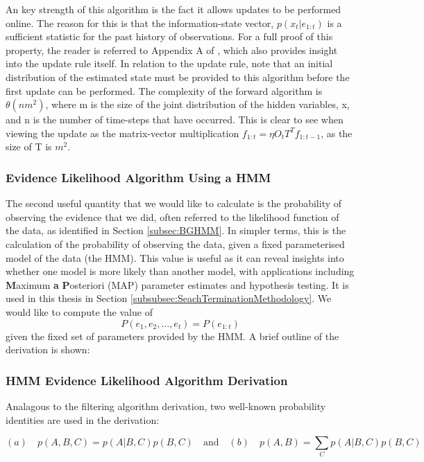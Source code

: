 An key strength of this algorithm is the fact it allows updates to be performed online. The reason for this is that the information-state vector, $p(x_t | e_{1:t})$ is a sufficient statistic for the past history of observations. For a full proof of this property, the reader is referred to Appendix A of \cite{Smallwood1973TheHorizon}, which also provides insight into the update rule itself. In relation to the update rule, note that an initial distribution of the estimated state must be provided to this algorithm before the first update can be performed. The complexity of the forward algorithm is $\theta (nm^2)$, where m is the size of the joint distribution of the hidden variables, x, and n is the number of time-steps that have occurred. This is clear to see when viewing the update as the matrix-vector multiplication $f_{1:t} = \eta O_{t} T^{T} f_{1:t-1}$, as the size of T is $m^2$.






\subsubsection{Evidence Likelihood Algorithm Using a HMM}\label{subsubsec:EvLikelihood}
The second useful quantity that we would like to calculate is the probability of observing the evidence that we did, often referred to the likelihood function of the data, as identified in Section \ref{subsec:BGHMM}. In simpler terms, this is the calculation of the probability of observing the data, given a fixed parameterised model of the data (the HMM). This value is useful as it can reveal insights into whether one model is more likely than another model, with applications including \textbf{M}aximum \textbf{a} \textbf{P}osteriori (MAP) parameter estimates and hypothesis testing. It is used in this thesis in Section \ref{subsubsec:SeachTerminationMethodology}. We would like to compute the value of
\[P(e_1, e_2, ..., e_t) = P(e_{1:t})\]
given the fixed set of parameters provided by the HMM. A brief outline of the derivation is shown: 


\subsubsection{HMM Evidence Likelihood Algorithm Derivation}\label{subsubsec:BGEvidenceLikelihood}

Analagous to the filtering algorithm derivation, two well-known probability identities are used in the derivation: 
\begin{center}
\end{center}
\[(a) \quad p(A, B, C) = p(A | B, C) p(B, C) \quad \text{and} \quad (b) \quad p(A, B) = \sum_{C}{p(A | B, C)p(B, C)}\]

